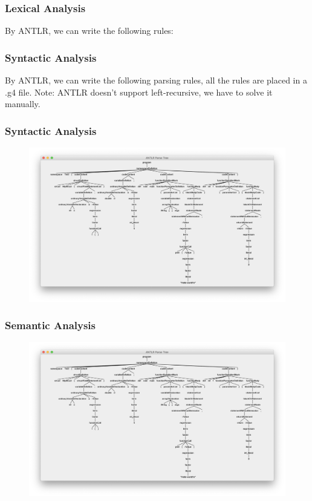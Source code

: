 \documentclass{beamer}
\begin{document}
\begin{frame}
    \frametitle{Lexical Analysis}
    By ANTLR, we can write the following rules:
\end{frame}

\begin{frame}
    \frametitle{Syntactic Analysis}
    By ANTLR, we can write the following parsing rules, all the rules are placed in a .g4 file.
    Note: ANTLR doesn't support left-recursive, we have to solve it manually.
\end{frame}


\begin{frame}
    \frametitle{Syntactic Analysis}
    \begin{figure}[h]
        \centering
        \includegraphics[scale=0.28]{assets/ParseTree.png}
    \end{figure}
\end{frame}

\begin{frame}
    \frametitle{Semantic Analysis}
    \begin{figure}[h]
        \centering
        \includegraphics[scale=0.28]{assets/ParseTree.png}
    \end{figure}
\end{frame}
\end{document}
